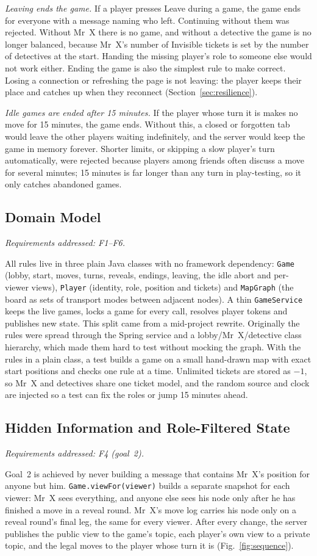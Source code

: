 \documentclass[lettersize,journal]{IEEEtran}
\newcommand{\reqs}[1]{\noindent\textit{Requirements addressed: #1.}\par\smallskip}
\begin{document}
\emph{Leaving ends the game.} If a player presses Leave during a game, the game ends for everyone with a message naming who left. Continuing without them was rejected. Without Mr~X there is no game, and without a detective the game is no longer balanced, because Mr~X's number of Invisible tickets is set by the number of detectives at the start. Handing the missing player's role to someone else would not work either. Ending the game is also the simplest rule to make correct. Losing a connection or refreshing the page is not leaving: the player keeps their place and catches up when they reconnect (Section~\ref{sec:resilience}).

\emph{Idle games are ended after 15 minutes.} If the player whose turn it is makes no move for 15 minutes, the game ends. Without this, a closed or forgotten tab would leave the other players waiting indefinitely, and the server would keep the game in memory forever. Shorter limits, or skipping a slow player's turn automatically, were rejected because players among friends often discuss a move for several minutes; 15 minutes is far longer than any turn in play-testing, so it only catches abandoned games.

\subsection{Domain Model}\label{sec:domain}
\reqs{F1--F6}
All rules live in three plain Java classes with no framework dependency: \texttt{Game} (lobby, start, moves, turns, reveals, endings, leaving, the idle abort and per-viewer views), \texttt{Player} (identity, role, position and tickets) and \texttt{MapGraph} (the board as sets of transport modes between adjacent nodes). A thin \texttt{GameService} keeps the live games, locks a game for every call, resolves player tokens and publishes new state. This split came from a mid-project rewrite. Originally the rules were spread through the Spring service and a lobby/Mr~X/detective class hierarchy, which made them hard to test without mocking the graph. With the rules in a plain class, a test builds a game on a small hand-drawn map with exact start positions and checks one rule at a time. Unlimited tickets are stored as $-1$, so Mr~X and detectives share one ticket model, and the random source and clock are injected so a test can fix the roles or jump 15 minutes ahead.

\subsection{Hidden Information and Role-Filtered State}\label{sec:hidden}
\reqs{F4 (goal~2)}
Goal~2 is achieved by never building a message that contains Mr~X's position for anyone but him. \texttt{Game.viewFor(viewer)} builds a separate snapshot for each viewer: Mr~X sees everything, and anyone else sees his node only after he has finished a move in a reveal round. Mr~X's move log carries his node only on a reveal round's final leg, the same for every viewer. After every change, the server publishes the public view to the game's topic, each player's own view to a private topic, and the legal moves to the player whose turn it is (Fig.~\ref{fig:sequence}).
\end{document}
